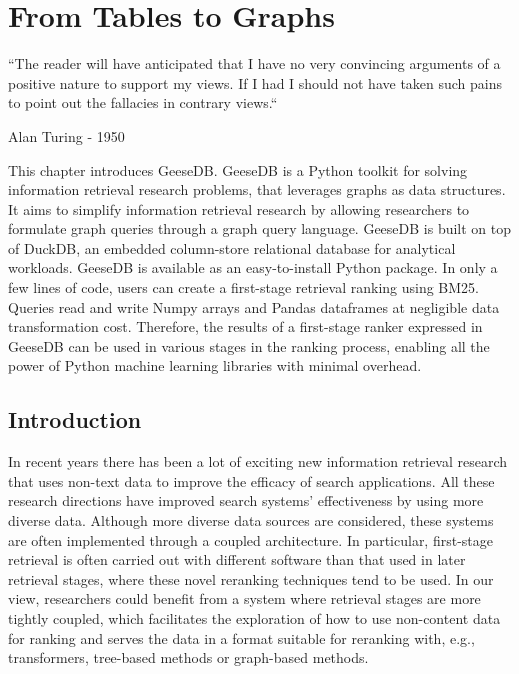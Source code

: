 \chapter{From Tables to Graphs}
\label{from-tables-to-graphs}
\epigraph{``The reader will have anticipated that I have no very convincing
	arguments of a positive nature to support my views. If I had I should not
	have taken such pains to point out the fallacies in contrary views.``}{Alan Turing - 1950}

\begin{Abstract}
	\begin{changemargin}{1cm}{1cm}
		This chapter introduces GeeseDB. GeeseDB is a Python toolkit for solving information retrieval research problems, that leverages graphs as data structures. It aims to simplify information retrieval research by allowing researchers to formulate graph queries through a graph query language. GeeseDB is built on top of DuckDB, an embedded column-store relational database for analytical workloads. GeeseDB is available as an easy-to-install Python package. In only a few lines of code, users can create a first-stage retrieval ranking using BM25. Queries read and write Numpy arrays and Pandas dataframes at negligible data transformation cost. Therefore, the results of a first-stage ranker expressed in GeeseDB can be used in various stages in the ranking process, enabling all the power of Python machine learning libraries with minimal overhead.
	\end{changemargin}
\end{Abstract}

\section{Introduction}
In recent years there has been a lot of exciting new information retrieval research that uses non-text data to improve the efficacy of search applications. All these research directions have improved search systems' effectiveness by using more diverse data. Although more diverse data sources are considered, these systems are often implemented through a coupled architecture. In particular, first-stage retrieval is often carried out with different software than that used in later retrieval stages, where these novel reranking techniques tend to be used. In our view, researchers could benefit from a system where retrieval stages are more tightly coupled, which facilitates the exploration of how to use non-content data for ranking and serves the data in a format suitable for reranking with, e.g., transformers, tree-based methods or graph-based methods.

